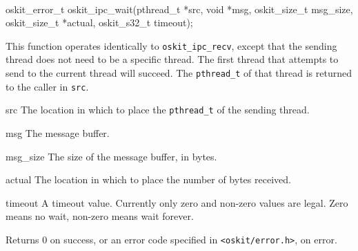 \begin{apisyn}
	\\

	\funcproto oskit_error_t
	oskit_ipc_wait(pthread_t *src,
		       void *msg, oskit_size_t msg_size, oskit_size_t *actual,
		       oskit_s32_t timeout);
\end{apisyn}
\begin{apidesc}
	This function operates identically to {\tt oskit_ipc_recv}, except
	that the sending thread does not need to be a specific thread. The
	first thread that attempts to send to the current thread will
	succeed. The {\tt pthread_t} of that thread is returned to the
	caller in {\tt src}.
\end{apidesc}
\begin{apiparm}
	\item[src]
		The location in which to place the {\tt pthread_t} of the
		sending thread. 
	\item[msg]
		The message buffer.
	\item[msg_size]
		The size of the message buffer, in bytes.
	\item[actual]
		The location in which to place the number of bytes received.
	\item[timeout]
		A timeout value. Currently only zero and non-zero values
		are legal. Zero means no wait, non-zero means wait forever.
\end{apiparm}
\begin{apiret}
	Returns 0 on success, or an error code specified in
	{\tt <oskit/error.h>}, on error.
\end{apiret}


